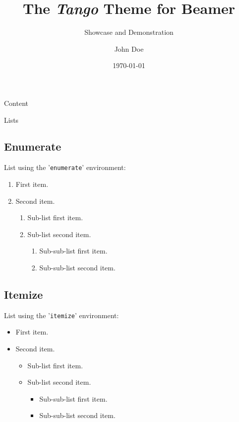 \documentclass[8pt, handout, aspectratio = 1510]{beamer}
\title{The \textit{Tango} Theme for Beamer}
\subtitle{Showcase and Demonstration}
\author{John Doe}
\institute{Univseristy of Applied Sciences Düsseldorf}
\date{\today}
\begin{document}
	\begin{frame}
    \titlepage
  \end{frame}%

	\begin{frame}[allowframebreaks]{Content}
		\tableofcontents
	\end{frame}

	\begin{frame}{Lists}
		\subsection{Enumerate}
		List using the '\texttt{enumerate}' environment:
		\begin{enumerate}
			\item First item.
			\item Second item.
			\begin{enumerate}
				\item Sub-list first item.
				\item Sub-list second item.
				\begin{enumerate}
					\item Sub-sub-list first item.
					\item Sub-sub-list second item.
				\end{enumerate}
			\end{enumerate}
		\end{enumerate}

		\vspace{5mm}
		\subsection{Itemize}
		List using the '\texttt{itemize}' environment:
		\begin{itemize}
			\item First item.
			\item Second item.
			\begin{itemize}
				\item Sub-list first item.
				\item Sub-list second item.
				\begin{itemize}
					\item Sub-sub-list first item.
					\item Sub-sub-list second item.
				\end{itemize}
			\end{itemize}
		\end{itemize}
	\end{frame}
\end{document}
